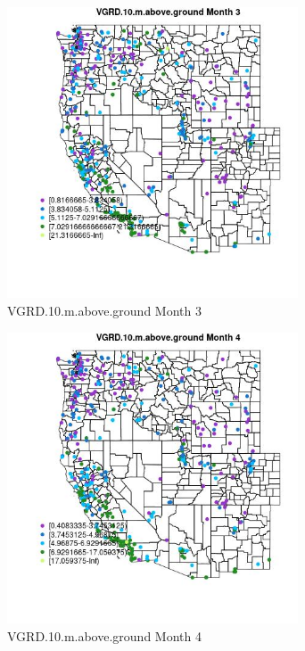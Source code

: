 \begin{figure} 
\centering  
\includegraphics[width=0.77\textwidth]{Code_Outputs/ML_input_report_ML_input_PM25_Step5_part_d_de_duplicated_aves_ML_input_MapObsMo3VGRD10maboveground.jpg} 
\caption{\label{fig:ML_input_report_ML_input_PM25_Step5_part_d_de_duplicated_aves_ML_inputMapObsMo3VGRD10maboveground}VGRD.10.m.above.ground Month 3} 
\end{figure} 
 

\clearpage 

\begin{figure} 
\centering  
\includegraphics[width=0.77\textwidth]{Code_Outputs/ML_input_report_ML_input_PM25_Step5_part_d_de_duplicated_aves_ML_input_MapObsMo4VGRD10maboveground.jpg} 
\caption{\label{fig:ML_input_report_ML_input_PM25_Step5_part_d_de_duplicated_aves_ML_inputMapObsMo4VGRD10maboveground}VGRD.10.m.above.ground Month 4} 
\end{figure} 
 

